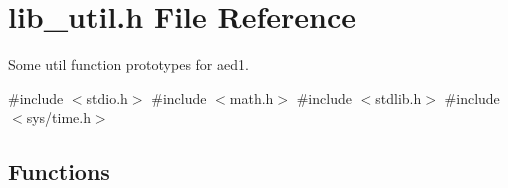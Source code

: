 \section{lib\+\_\+util.\+h File Reference}
\label{lib__util_8h}


Some util function prototypes for aed1.  


{\ttfamily \#include $<$stdio.\+h$>$}\newline
{\ttfamily \#include $<$math.\+h$>$}\newline
{\ttfamily \#include $<$stdlib.\+h$>$}\newline
{\ttfamily \#include $<$sys/time.\+h$>$}\newline
\subsection*{Functions}
